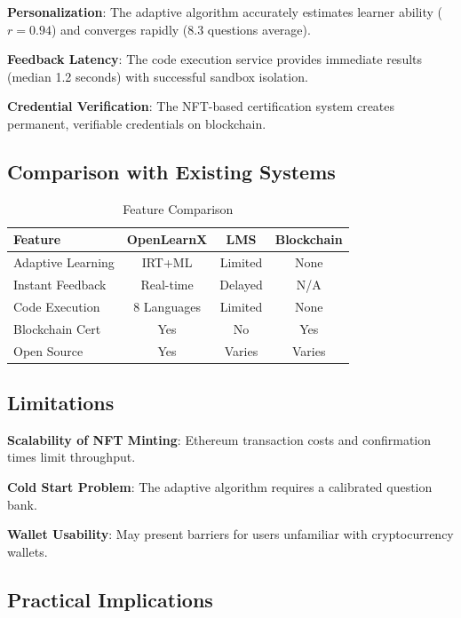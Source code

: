 \documentclass[conference]{IEEEtran}
\begin{document}
\textbf{Personalization}: The adaptive algorithm accurately estimates learner ability ($r = 0.94$) and converges rapidly (8.3 questions average).

\textbf{Feedback Latency}: The code execution service provides immediate results (median 1.2 seconds) with successful sandbox isolation.

\textbf{Credential Verification}: The NFT-based certification system creates permanent, verifiable credentials on blockchain.

\subsection{Comparison with Existing Systems}

\begin{table}[htbp]
\caption{Feature Comparison}
\begin{center}
\begin{tabular}{|l|c|c|c|}
\hline
\textbf{Feature} & \textbf{OpenLearnX} & \textbf{LMS} & \textbf{Blockchain} \\
\hline
Adaptive Learning & IRT+ML & Limited & None \\
\hline
Instant Feedback & Real-time & Delayed & N/A \\
\hline
Code Execution & 8 Languages & Limited & None \\
\hline
Blockchain Cert & Yes & No & Yes \\
\hline
Open Source & Yes & Varies & Varies \\
\hline
\end{tabular}
\label{tab:comparison}
\end{center}
\end{table}

\subsection{Limitations}

\textbf{Scalability of NFT Minting}: Ethereum transaction costs and confirmation times limit throughput.

\textbf{Cold Start Problem}: The adaptive algorithm requires a calibrated question bank.

\textbf{Wallet Usability}: May present barriers for users unfamiliar with cryptocurrency wallets.

\subsection{Practical Implications}
\end{document}
